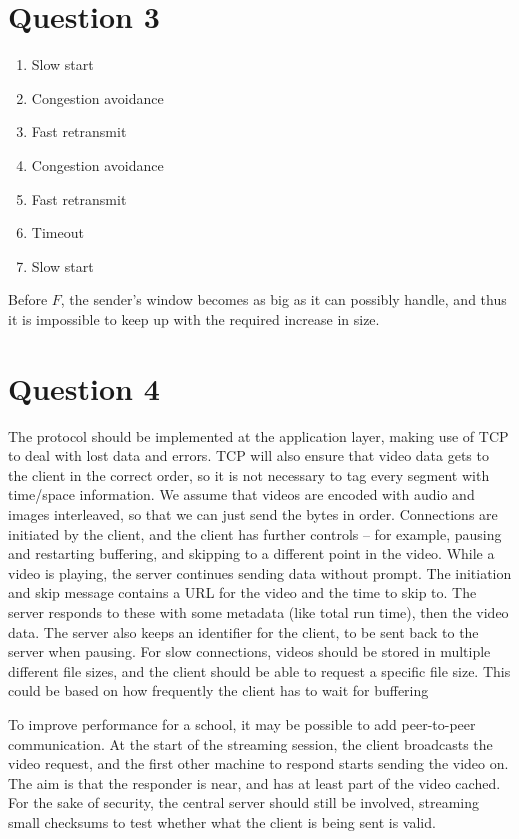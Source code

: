 \documentclass{article}
\begin{document}
\section*{Question 3}
\begin{enumerate}[label=\Alph{enumi}.]
  \item Slow start
  \item Congestion avoidance
  \item Fast retransmit
  \item Congestion avoidance
  \item Fast retransmit
  \item Timeout
  \item Slow start
\end{enumerate}
Before $F$, the sender's window becomes as big as it can possibly handle, and thus it is impossible to keep up with the required increase in size.

\section*{Question 4}
The protocol should be implemented at the application layer, making use of TCP to deal with lost data and errors. TCP will also ensure that video data gets to the client in the correct order, so it is not necessary to tag every segment with time/space information. We assume that videos are encoded with audio and images interleaved, so that we can just send the bytes in order. Connections are initiated by the client, and the client has further controls -- for example, pausing and restarting buffering, and skipping to a different point in the video. While a video is playing, the server continues sending data without prompt. The initiation and skip message contains a URL for the video and the time to skip to. The server responds to these with some metadata (like total run time), then the video data. The server also keeps an identifier for the client, to be sent back to the server when pausing. For slow connections, videos should be stored in multiple different file sizes, and the client should be able to request a specific file size. This could be based on how frequently the client has to wait for buffering

To improve performance for a school, it may be possible to add peer-to-peer communication. At the start of the streaming session, the client broadcasts the video request, and the first other machine to respond starts sending the video on. The aim is that the responder is near, and has at least part of the video cached. For the sake of security, the central server should still be involved, streaming small checksums to test whether what the client is being sent is valid.
\end{document}
